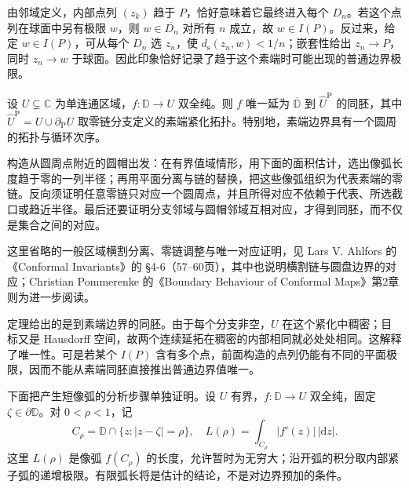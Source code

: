 \ProseParagraphBreak
由邻域定义，内部点列 \((z_k)\) 趋于 \(P\)，恰好意味着它最终进入每个 \(D_n\)。若这个点列在球面中另有极限 \(w\)，则 \(w\in\overline{D_n}\) 对所有 \(n\) 成立，故 \(w\in I(P)\)。反过来，给定 \(w\in I(P)\)，可从每个 \(D_n\) 选 \(z_n\)，使 \(d_{\mathrm s}(z_n,w)<1/n\)；嵌套性给出 \(z_n\to P\)，同时 \(z_n\to w\) 于球面。因此印象恰好记录了趋于这个素端时可能出现的普通边界极限。

\begin{theorem}[深层素端对应定理]\label{b3:thm:07-prime-end-correspondence}
设 \(U\subsetneq\mathbb C\) 为单连通区域，\(f:\mathbb D\rightarrow U\) 双全纯。则 \(f\) 唯一延为 \(\overline{\mathbb D}\) 到 \(\widehat U^{\mathrm P}\) 的同胚，其中 \(\widehat U^{\mathrm P}=U\cup\partial_{\mathrm P}U\) 取零链分支定义的素端紧化拓扑。特别地，素端边界具有一个圆周的拓扑与循环次序。
\end{theorem}
\begin{proofsketch}
构造从圆周点附近的圆帽出发：在有界值域情形，用下面的面积估计，选出像弧长度趋于零的一列半径；再用平面分离与链的替换，把这些像弧组织为代表素端的零链。反向须证明任意零链只对应一个圆周点，并且所得对应不依赖于代表、所选截口或趋近半径。最后还要证明分支邻域与圆帽邻域互相对应，才得到同胚，而不仅是集合之间的对应。

这里省略的一般区域横割分离、零链调整与唯一对应证明，见 Lars V. Ahlfors 的《Conformal Invariants》\cite{Ahlfors2010Conformal}的 \S4-6（57--60页），其中也说明横割链与圆盘边界的对应；Christian Pommerenke 的《Boundary Behaviour of Conformal Maps》\cite{Pommerenke1992Boundary}第2章则为进一步阅读。
\end{proofsketch}
定理给出的是到素端边界的同胚。由于每个分支非空，\(U\) 在这个紧化中稠密；目标又是 Hausdorff 空间，故两个连续延拓在稠密的内部相同就必处处相同。这解释了唯一性。可是若某个 \(I(P)\) 含有多个点，前面构造的点列仍能有不同的平面极限，因而不能从素端同胚直接推出普通边界值唯一。

\ProseParagraphBreak
下面把产生短像弧的分析步骤单独证明。设 \(U\) 有界，\(f:\mathbb D\to U\) 双全纯，固定 \(\zeta\in\partial\mathbb D\)。对 \(0<\rho<1\)，记
\[
 C_\rho=\mathbb D\cap\{z:|z-\zeta|=\rho\},
 \quad L(\rho)=\int_{C_\rho}|f'(z)|\,|\mathrm dz|.
\]
这里 \(L(\rho)\) 是像弧 \(f(C_\rho)\) 的长度，允许暂时为无穷大；沿开弧的积分取内部紧子弧的递增极限。有限弧长将是估计的结论，不是对边界预加的条件。

